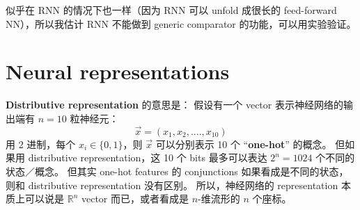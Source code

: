 \documentclass[12pt, orivec]{article}
\begin{document}
似乎在 RNN 的情况下也一样（因为 RNN 可以 unfold 成很长的 feed-forward NN），所以我估计 RNN 不能做到 generic comparator 的功能，可以用实验验证。 

\section{Neural representations}


\textbf{Distributive representation} 的意思是： 假设有一个 vector 表示神经网络的输出端有 $n = 10$ 粒神经元：
\begin{equation}
\vec{x} = (x_1, x_2, .... , x_{10})
\end{equation}
用 2 进制，每个 $x_i \in \{ 0, 1 \}$，则 $\vec{x}$ 可以分别表示 10 个 ``\textbf{one-hot}'' 的概念。  但如果用 distributive representation，这 10 个 bits 最多可以表达 $2^n = 1024$ 个不同的状态／概念。  但其实 one-hot features 的 conjunctions 如果看成是不同的状态，则和 distributive representation 没有区别。  所以，神经网络的 representation 本质上可以说是 $\mathbb{R}^n$ vector 而已，或者看成是 $n$-维流形的 $n$ 个座标。

\end{document}
